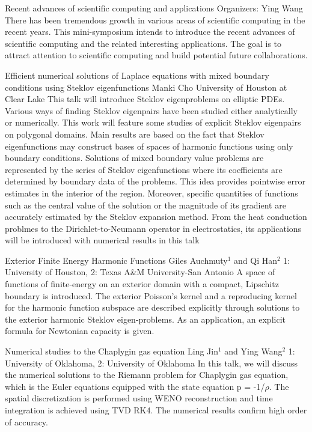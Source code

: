 \label{mini15}

\miniabs
{Recent advances of scientific computing and applications}
{Organizers: Ying Wang}
{There has been tremendous growth in various areas of scientific computing in the recent years. This mini-symposium intends to introduce the recent advances of scientific computing and the related interesting applications. The goal is to attract attention to scientific computing and build potential future collaborations.}

\begin{addmargin}[2em]{0em}
\vspace{2ex}
\abs
{Efficient numerical solutions of Laplace equations with mixed boundary conditions using Steklov eigenfunctions }
{Manki Cho}
{University of Houston at Clear Lake}
{This talk will introduce Steklov eigenproblems on elliptic PDEs. Various ways of finding Steklov eigenpairs have been studied either analytically or numerically. This work will feature some studies of explicit Steklov eigenpairs on polygonal domains. Main results are based on the fact that Steklov eigenfunctions may construct bases of spaces of harmonic functions using only boundary conditions. Solutions of mixed boundary value problems are represented by the series of Steklov eigenfunctions where its coefficients are determined by boundary data of the problems. This idea provides pointwise error estimates in the interior of the region. Moreover, specific quantities of functions such as the central value of the solution or the magnitude of its gradient are accurately estimated by the Steklov expansion method. From the heat conduction problmes to the Dirichlet-to-Neumann operator in electrostatics, its applications will be introduced with numerical results in this talk}


\vspace{1.5ex}
\abs
{Exterior Finite Energy Harmonic Functions}
{Giles Auchmuty$^{1}$  and Qi Han$^{2}$}
{1: University of Houston, 2: Texas A\&M University-San Antonio}
{A space of functions of finite-energy on an exterior domain with a compact, Lipschitz boundary is introduced.
The exterior Poisson's kernel and a reproducing kernel for the harmonic function subspace are described explicitly through solutions to the exterior harmonic Steklov eigen-problems. As an application, an explicit formula for Newtonian capacity is given.}


\vspace{1.5ex}
\abs
{Numerical studies to the Chaplygin gas equation}
{Ling Jin$^{1}$ and Ying Wang$^{2}$}
{1: University of Oklahoma, 2: University of Oklahoma}
{In this talk, we will discuss the numerical solutions to the Riemann problem for Chaplygin gas equation, which is the Euler equations equipped with the state equation p = -1/$\rho$. The spatial discretization is performed using WENO reconstruction and time integration is achieved using TVD RK4. The numerical results confirm high order of accuracy.}



\end{addmargin}
